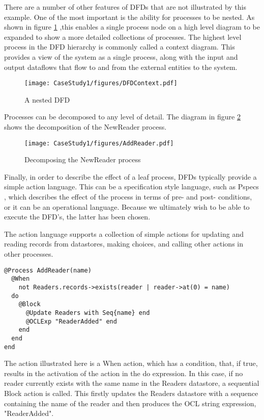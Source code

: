 There are a number of other features of DFDs that are not
illustrated by this example. One of the most important is the
ability for processes to be nested. As shown in figure
\ref{dfdnested} ,this enables a single process node on a high level
diagram to be expanded to show a more detailed collections of
processes. The highest level process in the DFD hierarchy is
commonly called a context diagram. This provides a view of the
system as a single process, along with the input and output
dataflows that flow to and from the external entities to the
system.

\begin{figure}[htb]
\begin{center}
\texttt{[image: CaseStudy1/figures/DFDContext.pdf]}
\caption{A nested DFD} \label{dfdnested}
\end{center}
\end{figure}

Processes can be decomposed to any level of detail. The diagram in
figure \ref{addreader} shows the decomposition of the NewReader
process.

\begin{figure}[htb]
\begin{center}
\texttt{[image: CaseStudy1/figures/AddReader.pdf]}
\caption{Decomposing the NewReader process} \label{addreader}
\end{center}
\end{figure}

Finally, in order to describe the effect of a leaf process, DFDs
typically provide a simple action language. This can be a
specification style language, such as Pspecs \cite{}, which
describes the effect of the process in terms of pre- and post-
conditions, or it can be an operational language. Because we
ultimately wish to be able to execute the DFD's, the latter has
been chosen.

The action language supports a collection of simple actions for
updating and reading records from datastores, making choices, and
calling other actions in other processes.


\begin{lstlisting}
@Process AddReader(name)
  @When
    not Readers.records->exists(reader | reader->at(0) = name)
  do
    @Block
      @Update Readers with Seq{name} end
      @OCLExp "ReaderAdded" end
    end
  end
end
\end{lstlisting}
The action illustrated here is a When action, which has a
condition, that, if true, results in the activation of the action
in the do expression. In this case, if no reader currently exists
with the same name in the Readers datastore, a sequential Block
action is called. This firstly updates the Readers datastore with a
sequence containing the name of the reader and then produces the
OCL string expression, "ReaderAdded".

